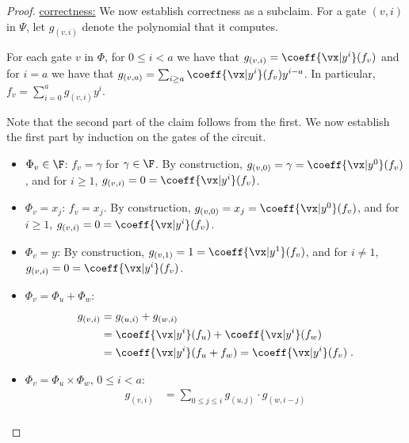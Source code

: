 \documentclass[11pt]{article}
\numberwithin{equation}{section}
\theoremstyle{definition}
\theoremstyle{plain}
\begin{document}
\begin{proof}
        \uline{correctness:} We now establish correctness as a subclaim.  For a gate $(v,i)$ in $\Psi$, let $g_{(v,i)}$ denote the polynomial that it computes.

        \begin{subclaim}
                For each gate $v$ in $\Phi$, for $0\le i<a$ we have that $g_{(v,i)}=\coeff{\vx|y^i}(f_v)$ and for $i=a$ we have that $g_{(v,a)}=\sum_{i\ge a} \coeff{\vx|y^i}(f_v)y^{i-a}$.  In particular, $f_v=\sum_{i=0}^a g_{(v,i)}y^i$.
        \end{subclaim}
        \begin{subproof}
                Note that the second part of the claim follows from the first. We now establish the first part by induction on the gates of the circuit.

                \begin{itemize}
                        \item $\Phi_v\in\F$: $f_v=\gamma$ for $\gamma\in\F$. By construction, $g_{(v,0)}=\gamma=\coeff{\vx|y^0}(f_v)$, and for $i\ge1$, $g_{(v,i)}=0=\coeff{\vx|y^i}(f_v)$.
                        \item $\Phi_v=x_j$: $f_v=x_j$. By construction, $g_{(v,0)}=x_j=\coeff{\vx|y^0}(f_v)$, and for $i\ge1$, $g_{(v,i)}=0=\coeff{\vx|y^i}(f_v)$.
                        \item $\Phi_v=y$: By construction, $g_{(v,1)}=1=\coeff{\vx|y^1}(f_v)$, and for $i\ne 1$, $g_{(v,i)}=0=\coeff{\vx|y^i}(f_v)$.
                        \item $\Phi_v=\Phi_u+\Phi_w$:
                                \begin{align*}
                                        g_{(v,i)}
                                        &=g_{(u,i)}+g_{(w,i)}\\
                                        &=\coeff{\vx|y^i}(f_u)+\coeff{\vx|y^i}(f_w)\\
                                        &=\coeff{\vx|y^i}(f_u+f_w)
                                        =\coeff{\vx|y^i}(f_v)
                                        \;.
                                \end{align*}
                        \item $\Phi_v=\Phi_u\times\Phi_w$, $0\le i<a$:
                                \begin{align*}
                                        g_{(v,i)}
                                        &=\sum_{0\le j\le i} g_{(u,j)}\cdot g_{(w,i-j)}\\

\end{align*}
\end{itemize}
\end{subproof}
\end{proof}
\end{document}
